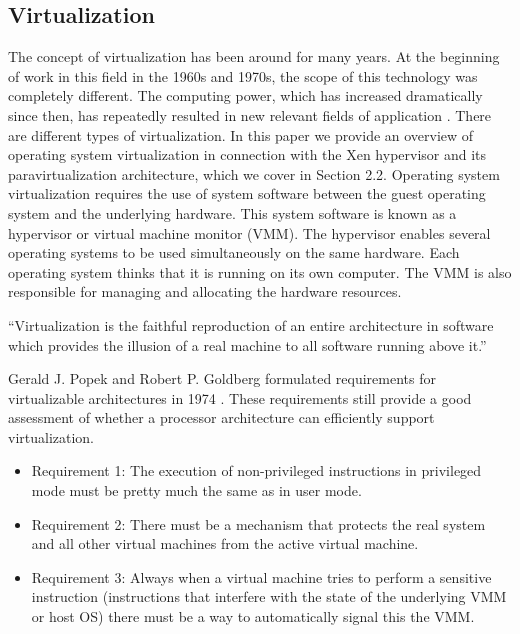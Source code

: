 \documentclass[sigconf]{acmart}
\begin{document}
\subsection{Virtualization}
The concept of virtualization has been around for many years. At the beginning of work in this field in the 1960s and 1970s, the scope of this technology was completely different. The computing power, which has increased dramatically since then, has repeatedly resulted in new relevant fields of application \cite{graziano2011performance}. There are different types of virtualization.
In this paper we provide an overview of operating system virtualization in connection with the Xen hypervisor and its
paravirtualization architecture, which we cover in Section 2.2.
\newline
\newline
Operating system virtualization requires the use of system software between the guest operating system and the underlying hardware. This system software is known as a hypervisor or virtual machine monitor (VMM).
The hypervisor enables several operating systems to be used simultaneously on the same hardware.
Each operating system thinks that it is running on its own computer. The VMM is also responsible for managing and allocating the hardware resources.
\newpage
\begin{definition}
``Virtualization is the faithful reproduction of an entire architecture in software which provides the illusion of a real machine to all software running above it.'' \cite{kiyanclar2005survey}
\newline
\end{definition}

Gerald J. Popek and Robert P. Goldberg formulated requirements for virtualizable architectures in 1974 \cite{popek1974formal}. These requirements still provide a good assessment of whether a processor architecture can efficiently support virtualization.
\newline
\begin{itemize}
	\item Requirement 1: The execution of non-privileged instructions in privileged mode must be pretty much the same as in user mode.
	\newline 
	\item Requirement 2: There must be a mechanism that protects the real system and all other virtual machines from the active virtual machine.
	\newline
	\item Requirement 3: Always when a virtual machine tries to perform a sensitive instruction (instructions that interfere with the state of the underlying VMM or host OS) there must be a way to automatically signal this the VMM.
\newline
\end{itemize}
\end{document}
